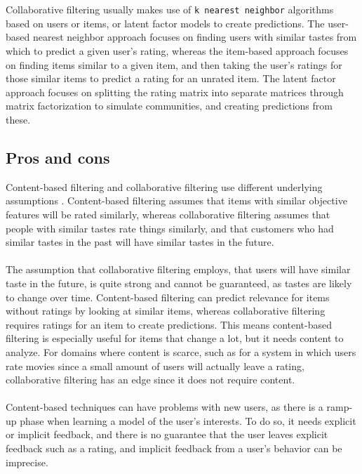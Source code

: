 \\\\
Collaborative filtering usually makes use of \texttt{k nearest neighbor} algorithms based on users or items, or latent factor models to create predictions.
The user-based nearest neighbor approach focuses on finding users with similar tastes from which to predict a given user's rating, whereas the item-based approach focuses on finding items similar to a given item, and then taking the user's ratings for those similar items to predict a rating for an unrated item.
The latent factor approach focuses on splitting the rating matrix into separate matrices through matrix factorization to simulate communities, and creating predictions from these.


\subsection{Pros and cons}\label{sec:recommender-pros-and-cons}
Content-based filtering and collaborative filtering use different underlying assumptions \cite{CollaborativeFiltering}.
Content-based filtering assumes that items with similar objective features will be rated similarly, whereas collaborative filtering assumes that people with similar tastes rate things similarly, and that customers who had similar tastes in the past will have similar tastes in the future.
\\\\
The assumption that collaborative filtering employs, that users will have similar taste in the future, is quite strong and cannot be guaranteed, as tastes are likely to change over time.
Content-based filtering can predict relevance for items without ratings by looking at similar items, whereas collaborative filtering requires ratings for an item to create predictions.
This means content-based filtering is especially useful for items that change a lot, but it needs content to analyze.
For domains where content is scarce, such as for a system in which users rate movies since a small amount of users will actually leave a rating, collaborative filtering has an edge since it does not require content.
\\\\
Content-based techniques can have problems with new users, as there is a ramp-up phase when learning a model of the user's interests.
To do so, it needs explicit or implicit feedback, and there is no guarantee that the user leaves explicit feedback such as a rating, and implicit feedback from a user's behavior can be imprecise.
